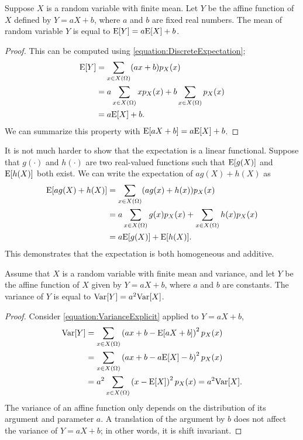 \begin{proposition}
Suppose $X$ is a random variable with finite mean.
Let $Y$ be the affine function of $X$ defined by $Y = aX + b$, where $a$ and $b$ are fixed real numbers.
The mean of random variable $Y$ is equal to $\mathrm{E} [Y] = a \mathrm{E} [X] + b$.
\end{proposition}
\begin{proof}
This can be computed using \eqref{equation:DiscreteExpectation};
\begin{equation*}
\begin{split}
\mathrm{E} [Y] &= \sum_{x \in X(\Omega)} (ax + b) p_X(x) \\
&= a \sum_{x \in X(\Omega)} x p_X(x) + b \sum_{x \in X(\Omega)} p_X(x) \\
&= a \mathrm{E} [X] + b.
\end{split}
\end{equation*}
We can summarize this property with $\mathrm{E} [a X + b] = a \mathrm{E} [X] + b$.
\end{proof}

It is not much harder to show that the expectation is a linear functional.
Suppose that $g(\cdot)$ and $h(\cdot)$ are two real-valued functions such that $\mathrm{E} [g(X)]$ and $\mathrm{E} [h(X)]$ both exist.
We can write the expectation of $a g(X) + h(X)$ as
\begin{equation*}
\begin{split}
\mathrm{E} [ a g(X) + h(X) ] &= \sum_{x \in X(\Omega)} (a g(x) + h(x)) p_X(x) \\
&= a \sum_{x \in X(\Omega)} g(x) p_X(x) + \sum_{x \in X(\Omega)} h(x) p_X(x) \\
&= a \mathrm{E} [g(X)] + \mathrm{E} [h(X)] .
\end{split}
\end{equation*}
This demonstrates that the expectation is both homogeneous and additive.

\begin{proposition}
Assume that $X$ is a random variable with finite mean and variance, and let $Y$ be the affine function of $X$ given by $Y = aX + b$, where $a$ and $b$ are constants.
The variance of $Y$ is equal to $\mathrm{Var} [Y] = a^2 \mathrm{Var} [X]$.
\end{proposition}
\begin{proof}
Consider \eqref{equation:VarianceExplicit} applied to $Y = aX + b$,
\begin{equation*}
\begin{split}
\mathrm{Var} [Y]
&= \sum_{x \in X(\Omega)} \left( ax + b - \mathrm{E} [aX + b] \right)^2 p_X(x) \\
&= \sum_{x \in X(\Omega)} \left( ax + b - a \mathrm{E} [X] - b \right)^2 p_X(x) \\
&= a^2 \sum_{x \in X(\Omega)} \left( x - \mathrm{E} [X] \right)^2 p_X(x)
= a^2 \mathrm{Var} [X] .
\end{split}
\end{equation*}
The variance of an affine function only depends on the distribution of its argument and parameter $a$.
A translation of the argument by $b$ does not affect the variance of $Y = aX + b$;
in other words, it is shift invariant.
\end{proof}



